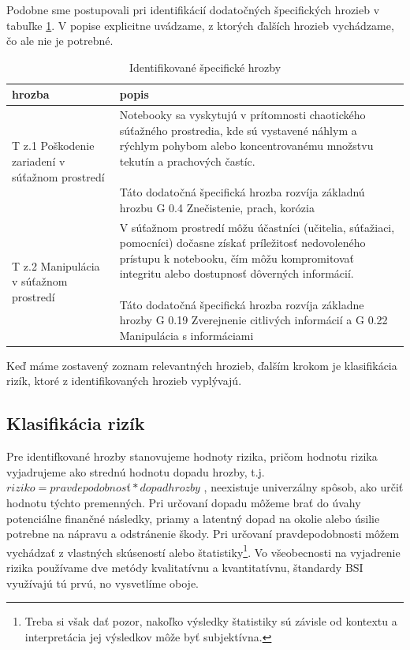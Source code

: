 Podobne sme postupovali pri identifikácií dodatočných špecifických hrozieb v tabuľke \ref{tab:specthreatid}. V popise explicitne uvádzame,
z ktorých ďalších hrozieb vychádzame, čo ale nie je potrebné.
\begin{table}[h!]
    \caption{Identifikované špecifické hrozby}
    \label{tab:specthreatid}
    \begin{center}
        \footnotesize
        \begin{tabular}{ |p{}|p{}| }
        \hline
        hrozba & popis \\
        \hline
        \hline
        T z.1 Poškodenie zariadení v súťažnom prostredí &
        \parbox[t]{0.80\textwidth}{
        Notebooky sa vyskytujú v prítomnosti chaotického súťažného prostredia, kde sú vystavené náhlym a rýchlym pohybom alebo koncentrovanému
        množstvu tekutín a prachových častíc. \\\\ Táto dodatočná špecifická hrozba rozvíja základnú hrozbu G 0.4 Znečistenie, prach, korózia 
        }\\

        \hline
        T z.2 Manipulácia v súťažnom prostredí &
        \parbox[t]{0.80\textwidth}{
        V súťažnom prostredí môžu účastníci (učitelia, súťažiaci, pomocníci) dočasne získať príležitosť nedovoleného prístupu k notebooku, čím
        môžu kompromitovať integritu alebo dostupnosť dôverných informácií. \\\\ Táto dodatočná špecifická hrozba rozvíja základne hrozby 
        G 0.19 Zverejnenie citlivých informácií a G 0.22 Manipulácia s informáciami 
        }\\
        \hline
        \end{tabular}
    \end{center}
\end{table}
Keď máme zostavený zoznam relevantných hrozieb, ďalším krokom je klasifikácia rizík, ktoré z identifikovaných hrozieb vyplývajú.

\subsection{Klasifikácia rizík}

Pre identifkované hrozby stanovujeme hodnoty rizika, pričom hodnotu rizika vyjadrujeme ako strednú hodnotu dopadu hrozby, t.j.
$riziko = pravdepodobnosť * dopad hrozby$ \cite{MFSRIB}, neexistuje univerzálny spôsob, ako určiť hodnotu týchto premenných. Pri určovaní
dopadu môžeme brať do úvahy potenciálne finančné následky, priamy a latentný dopad na okolie alebo úsilie potrebne na nápravu a odstránenie
škody. Pri určovaní pravdepodobnosti môžem vychádzať z vlastných skúseností alebo štatistiky\footnote{Treba si však dať pozor, nakoľko
výsledky štatistiky sú závisle od kontextu a interpretácia jej výsledkov  môže byť subjektívna.}. Vo všeobecnosti na vyjadrenie rizika
používame dve metódy kvalitatívnu a kvantitatívnu, štandardy BSI využívajú tú prvú, no vysvetlíme oboje.

